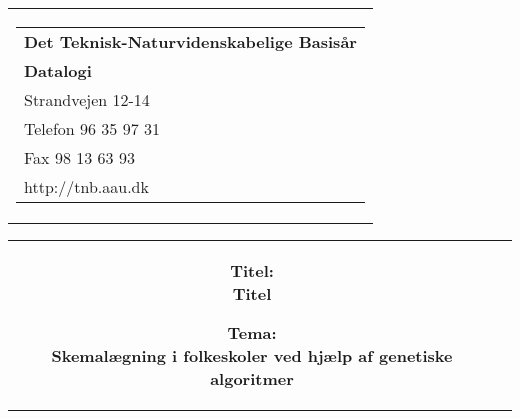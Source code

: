 \documentclass[12pt,hidelinks]{article}
\begin{document}
	\sloppy

	\begin{titlepage}
	\begin{nopagebreak}
	{\small\samepage 
	\hfill\begin{tabular}{r}
	\parbox{6cm}{  
	\hfill \parbox{4.9cm}{\begin{tabular}{l}
	{\sf\small \textbf{Det Teknisk-Naturvidenskabelige Basis{\aa}r }}\\
	{\sf\small  \textbf{Datalogi}} \\
	{\sf\small Strandvejen 12-14} \\
	{\sf\small Telefon 96 35 97 31} \\
	{\sf\small Fax 98 13 63 93} \\
	{\sf\small http://tnb.aau.dk}
	\end{tabular}}}
	\\
	\end{tabular}

	\begin{tabular}{cc}
	\parbox{7cm}{
	\begin{description}

	\item {\bf Titel: \\Titel} 
	  
	\item {\bf Tema: \\Skemalægning i folkeskoler ved hjælp af genetiske algoritmer} 

	\end{description}

	\parbox{7cm}{

}}
\end{tabular}}
\end{nopagebreak}
\end{titlepage}
\end{document}
